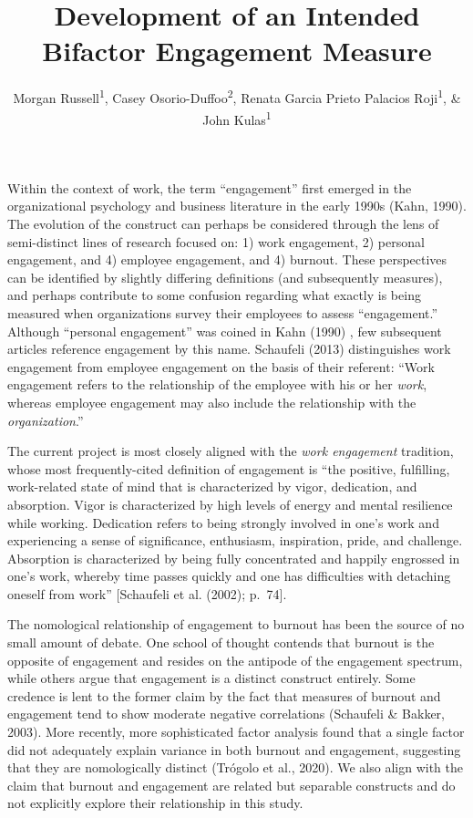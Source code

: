 \documentclass[
  english,
  man]{apa7}
\title{Development of an Intended Bifactor Engagement Measure}
\author{Morgan Russell\textsuperscript{1}, Casey Osorio-Duffoo\textsuperscript{2}, Renata Garcia Prieto Palacios Roji\textsuperscript{1}, \& John Kulas\textsuperscript{1}}
\date{}
\affiliation{\vspace{0.5cm}\textsuperscript{1} Montclair State University\\\textsuperscript{2} Harver}
\begin{document}
\maketitle

Within the context of work, the term ``engagement'' first emerged in the organizational psychology and business literature in the early 1990s (Kahn, 1990). The evolution of the construct can perhaps be considered through the lens of semi-distinct lines of research focused on: 1) work engagement, 2) personal engagement, and 4) employee engagement, and 4) burnout. These perspectives can be identified by slightly differing definitions (and subsequently measures), and perhaps contribute to some confusion regarding what exactly is being measured when organizations survey their employees to assess ``engagement.'' Although ``personal engagement'' was coined in Kahn (1990) , few subsequent articles reference engagement by this name. Schaufeli (2013) distinguishes work engagement from employee engagement on the basis of their referent: ``Work engagement refers to the relationship of the employee with his or her \emph{work}, whereas employee engagement may also include the relationship with the \emph{organization}.''

The current project is most closely aligned with the \emph{work engagement} tradition, whose most frequently-cited definition of engagement is ``the positive, fulfilling, work-related state of mind that is characterized by vigor, dedication, and absorption. Vigor is characterized by high levels of energy and mental resilience while working. Dedication refers to being strongly involved in one's work and experiencing a sense of significance, enthusiasm, inspiration, pride, and challenge. Absorption is characterized by being fully concentrated and happily engrossed in one's work, whereby time passes quickly and one has difficulties with detaching oneself from work'' {[}Schaufeli et al. (2002); p.~74{]}.

The nomological relationship of engagement to burnout has been the source of no small amount of debate. One school of thought contends that burnout is the opposite of engagement and resides on the antipode of the engagement spectrum, while others argue that engagement is a distinct construct entirely. Some credence is lent to the former claim by the fact that measures of burnout and engagement tend to show moderate negative correlations (Schaufeli \& Bakker, 2003). More recently, more sophisticated factor analysis found that a single factor did not adequately explain variance in both burnout and engagement, suggesting that they are nomologically distinct (Trógolo et al., 2020). We also align with the claim that burnout and engagement are related but separable constructs and do not explicitly explore their relationship in this study.
\end{document}
